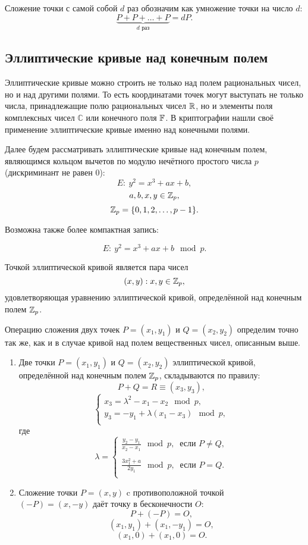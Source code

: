 Сложение точки с самой собой $d$ раз обозначим как умножение точки на число $d$:
    \[ \underbrace{P + P + \ldots + P}_{d \text{ раз}} = d P. \]


\subsection{Эллиптические кривые над конечным полем}

Эллиптические кривые можно строить не только над полем рациональных чисел, но и над другими полями. То есть координатами точек могут выступать не только числа, принадлежащие полю рациональных чисел $\mathbb{R}$, но и элементы поля комплексных чисел $\mathbb{C}$ или конечного поля $\mathbb{F}$. В криптографии нашли своё применение эллиптические кривые именно над конечными полями.

Далее будем рассматривать эллиптические кривые над конечным полем, являющимся кольцом вычетов по модулю нечётного простого числа $p$ (дискриминант не равен 0):
    \[ E: ~ y^2 = x^3 + a x + b, \]
    \[ a, b, x, y \in \mathbb{Z}_p, \]
    \[ \mathbb{Z}_p = \{0, 1, 2, \ldots, p-1\}.\]

Возможна также более компактная запись:

    \[ E: ~ y^2 = x^3 + a x + b \mod p.\]

Точкой эллиптической кривой является пара чисел
    \[ (x,y): x, y \in \mathbb{Z}_p, \]
удовлетворяющая уравнению эллиптической кривой, определённой над конечным полем $\mathbb{Z}_p$.

Операцию сложения двух точек $P = (x_1, y_1)$ и $Q = (x_2, y_2)$ определим точно так же, как и в случае кривой над полем вещественных чисел, описанным выше.

\begin{enumerate}
    \item Две точки $P = (x_1, y_1)$ и $Q = (x_2, y_2)$ эллиптической кривой, определённой над конечным полем $\mathbb{Z}_p$, складываются по правилу:
        \[
            P + Q = R \equiv (x_3, y_3),
        \] \[
            \left\{ \begin{array}{l}
                x_3 = \lambda^2 - x_1 - x_2 \mod p,\\
                y_3 = - y_1 + \lambda (x_1 - x_3) \mod p,\\
            \end{array} \right.
        \]
        где
        \[
            \lambda = \left\{ \begin{array}{l}
                \frac{y_2 - y_1}{x_2 - x_1} \mod p, ~ \text{ если } P \ne Q, \\
                \\
                \frac{3 x_1^2 + a}{2 y_1} \mod p, ~ \text{ если } P = Q. \\
            \end{array} \right.
        \]
    \item Сложение точки $P=(x,y)$ c противоположной точкой \\
        $(-P) = (x,-y)$ даёт точку в бесконечности $O$:
        \[ P + (-P) = O, \]
        \[ (x_1, y_1) + (x_1, -y_1) = O, \]
        \[ (x_1, 0) + (x_1, 0) = O. \]
\end{enumerate}

